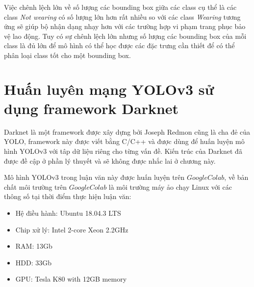 Việc chênh lệch lớn về số lượng các bounding box giữa các class cụ thể là các class \emph{Not wearing} có số lượng lớn hơn rất nhiều so với các class \emph{Wearing} tương ứng sẽ giúp bộ nhận dạng nhạy hơn với các trường hợp vi phạm trang phục bảo vệ lao động. Tuy có sự chênh lệch lớn nhưng số lượng các bounding box của mỗi class là đủ lớn để mô hình có thể học được các đặc trưng cần thiết để có thể phân loại class tốt cho một bounding box.

\section{Huấn luyên mạng YOLOv3 sử dụng framework Darknet}
Darknet\cite{alexey:2020:darknet} là một framework được xây dựng bởi Joseph Redmon cũng là cha đẻ của YOLO, framework này được viết bằng C/C++ và được dùng để huấn luyện mô hình YOLOv3 với tâp dữ liệu riêng cho từng vấn đề. Kiến trúc của Darknet đã được đề cập ở phần lý thuyết và sẽ không được nhắc lai ở chương này.

Mô hình YOLOv3 trong luận văn này được huấn luyện trên $Google Colab$, về bản chất môi trường trên $Google Colab$ là môi trường máy ảo chạy Linux với các thông số tại thời điểm thực hiện luận văn: 
\begin{itemize}
	\item Hệ điều hành: Ubuntu 18.04.3 LTS
	\item Chip xử lý: Intel 2-core Xeon 2.2GHz
	\item RAM: 13Gb
	\item HDD: 33Gb
	\item GPU: Tesla K80 with 12GB memory
\end{itemize}

